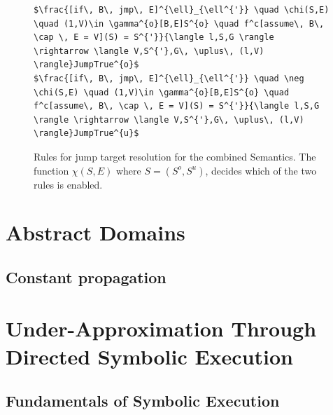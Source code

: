 \documentclass{kththesis}
\begin{document}
\begin{figure}[h]
    \centering
\begin{lstlisting}[style=abstractInt]
$\frac{[if\, B\, jmp\, E]^{\ell}_{\ell^{'}} \quad \chi(S,E) \quad (1,V)\in \gamma^{o}[B,E]S^{o} \quad f^c[assume\, B\, \cap \, E = V](S) = S^{'}}{\langle l,S,G \rangle \rightarrow \langle V,S^{'},G\, \uplus\, (l,V) \rangle}JumpTrue^{o}$
$\frac{[if\, B\, jmp\, E]^{\ell}_{\ell^{'}} \quad \neg \chi(S,E) \quad (1,V)\in \gamma^{o}[B,E]S^{o} \quad f^c[assume\, B\, \cap \, E = V](S) = S^{'}}{\langle l,S,G \rangle \rightarrow \langle V,S^{'},G\, \uplus\, (l,V) \rangle}JumpTrue^{u}$
\end{lstlisting}
\caption[Rules for jump target resolution for the combined Semantics.]{Rules for jump target resolution for the combined Semantics. The function $\chi(S,E)$ where $S=(S^o,S^u)$, decides which of the two rules is enabled.}
    \label{fig:combinedJumpTrue}
\end{figure}

\section{Abstract Domains}

\subsection{Constant propagation}


\section{ Under-Approximation Through Directed Symbolic Execution}
\subsection{Fundamentals of Symbolic Execution}
\end{document}
